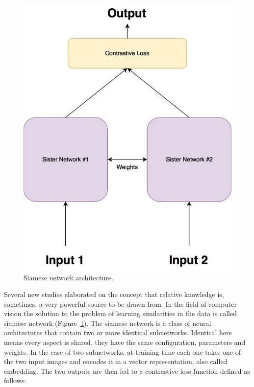 \begin{figure}[t!]
    \centering
    \captionsetup{justification=centering}
    \includegraphics[height=0.6\textheight]{./pictures/siamese}
    \caption{Siamese network architecture.}
    \label{fig:siamese}
\end{figure}
\noindent Several new studies elaborated on the concept that relative knowledge is, sometimes, a very powerful source to be drawn from. In the field of computer vision the solution to the problem of learning similarities in the data is called siamese network \cite{koch2015siamese} (Figure~\ref{fig:siamese}). The siamese network is a class of neural architectures that contain two or more identical subnetworks. Identical here means every aspect is shared, they have the same configuration, parameters and weights. In the case of two subnetworks, at training time each one takes one of the two input images and encodes it in a vector representation, also called embedding. The two outputs are then fed to a contrastive loss function \cite{hadsell2006dimensionality} defined as follows:
